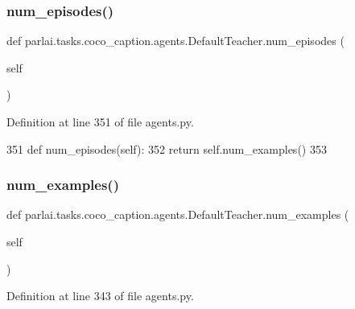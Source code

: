\subsubsection{\texorpdfstring{num\+\_\+episodes()}{num\_episodes()}}
{\footnotesize\ttfamily def parlai.\+tasks.\+coco\+\_\+caption.\+agents.\+Default\+Teacher.\+num\+\_\+episodes (\begin{DoxyParamCaption}\item[{}]{self }\end{DoxyParamCaption})}



Definition at line 351 of file agents.\+py.


\begin{DoxyCode}
351     \textcolor{keyword}{def }num\_episodes(self):
352         \textcolor{keywordflow}{return} self.num\_examples()
353 
\end{DoxyCode}
\mbox{\label{classparlai_1_1tasks_1_1coco__caption_1_1agents_1_1DefaultTeacher_abc57dc81be0b084f28af97aa62c2d531}} 
\subsubsection{\texorpdfstring{num\+\_\+examples()}{num\_examples()}}
{\footnotesize\ttfamily def parlai.\+tasks.\+coco\+\_\+caption.\+agents.\+Default\+Teacher.\+num\+\_\+examples (\begin{DoxyParamCaption}\item[{}]{self }\end{DoxyParamCaption})}



Definition at line 343 of file agents.\+py.


